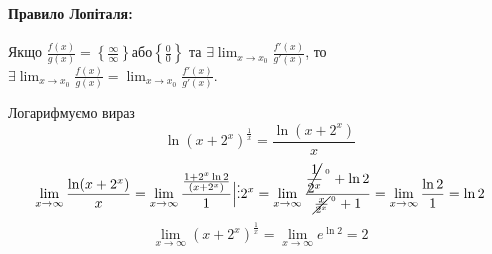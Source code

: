 \documentclass[../rgr1.tex]{subfiles}
\begin{document}

\paragraph{Правило Лопіталя:}
Якщо $\frac{f(x)}{g(x)}=\left\{ \frac{\infty}{\infty} \right\} \text{або} \left\{\frac{0}{0} \right\}$ та $\exists \lim_{x\to x_0}\frac{f'(x)}{g'(x)}$, то
$ \exists \lim_{x\to x_0}\frac{f(x)}{g(x)} = \lim_{x\to x_0}\frac{f'(x)}{g'(x)}.$

\Solution

Логарифмуємо вираз
\begin{equation}
	\ln(x+2^x)^{\frac{1}{x}} =
	\frac{\ln(x+2^x)}{x}
\end{equation}
\begin{equation}
	\lim_{x\to\infty} \frac{\ln(x+2^x)}{x} =
	\lim_{x\to\infty} \frac{\frac{1+2^x\ln 2}{(x+2^x)}}{1} \Big|\vdots 2^x =
\lim_{x\to{\infty}}{\dfrac{{\cancel{\dfrac{1}{2^{x}}}^{\,{^{0}}}}+\ln2}{{\cancel{\frac{x}{2^{x}}}^{\,{^{0}}}}+1}}=\lim_{x\to{\infty}}{\frac{\ln2}{1}}=\ln2
\end{equation}
\begin{equation}
	\lim_{x\to\infty}(x+2^x)^{\frac{1}{x}}
	=
	\lim_{x\to\infty}e^{\ln2} = 2
\end{equation}

\end{document}
